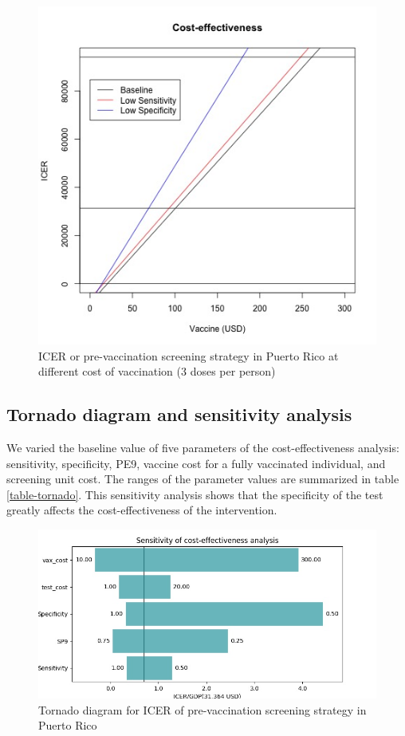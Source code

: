 \documentclass[11pt]{article}
\begin{document}
\begin{figure}[htbp]
\centering
\includegraphics[width=.9\linewidth]{../analysis/figures/report_figure_ICER.jpeg}
\caption{\label{fig-ICER}
ICER or pre-vaccination screening strategy in Puerto Rico at different cost of vaccination (3 doses per person)}
\end{figure}

\subsection{Tornado diagram and sensitivity analysis}
\label{sec:orgf1237fe}
We varied the baseline value of five parameters of the cost-effectiveness analysis: sensitivity, specificity, PE9, vaccine cost for a fully vaccinated individual, and screening unit cost. The ranges of the parameter values are summarized in table \ref{table-tornado}. This sensitivity analysis shows that the specificity of the test greatly affects the cost-effectiveness of the intervention. 

\begin{figure}[htbp]
\centering
\includegraphics[width=.9\linewidth]{../analysis/figures/report_figure_tornado_diagram.jpeg}
\caption{\label{fig-tornado}
Tornado diagram for ICER of pre-vaccination screening strategy in Puerto Rico}
\end{figure}
\end{document}

